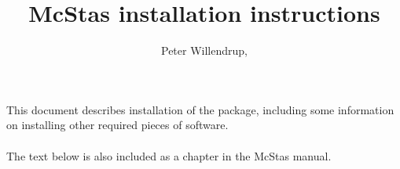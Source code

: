 \documentclass[a4paper,12pt]{article}
\title{McStas installation instructions}
\author{Peter
  Willendrup,\\\htmladdnormallink{peter.willendrup@risoe.dk}{mailto:peter.willendrup@risoe.dk}}
\begin{document}
\maketitle
\abstract \noindent This document describes installation of the
 package, including
some information on installing other required pieces of software.\\\
\\The text below is also included as a chapter in the McStas manual.

\end{document}
